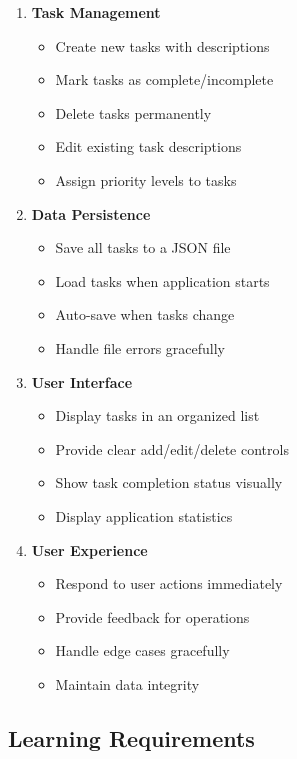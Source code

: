 \documentclass[
  letterpaper,
  DIV=11,
  numbers=noendperiod,
  oneside]{scrreprt}
\providecommand{\tightlist}{%
  \setlength{\itemsep}{0pt}\setlength{\parskip}{0pt}}\usepackage{longtable,booktabs,array}
\begin{document}
\begin{enumerate}
\def\labelenumi{\arabic{enumi}.}
\tightlist
\item
  \textbf{Task Management}

  \begin{itemize}
  \tightlist
  \item
    Create new tasks with descriptions
  \item
    Mark tasks as complete/incomplete
  \item
    Delete tasks permanently
  \item
    Edit existing task descriptions
  \item
    Assign priority levels to tasks
  \end{itemize}
\item
  \textbf{Data Persistence}

  \begin{itemize}
  \tightlist
  \item
    Save all tasks to a JSON file
  \item
    Load tasks when application starts
  \item
    Auto-save when tasks change
  \item
    Handle file errors gracefully
  \end{itemize}
\item
  \textbf{User Interface}

  \begin{itemize}
  \tightlist
  \item
    Display tasks in an organized list
  \item
    Provide clear add/edit/delete controls
  \item
    Show task completion status visually
  \item
    Display application statistics
  \end{itemize}
\item
  \textbf{User Experience}

  \begin{itemize}
  \tightlist
  \item
    Respond to user actions immediately
  \item
    Provide feedback for operations
  \item
    Handle edge cases gracefully
  \item
    Maintain data integrity
  \end{itemize}
\end{enumerate}

\subsection{Learning Requirements}\label{learning-requirements-11}
\end{document}

